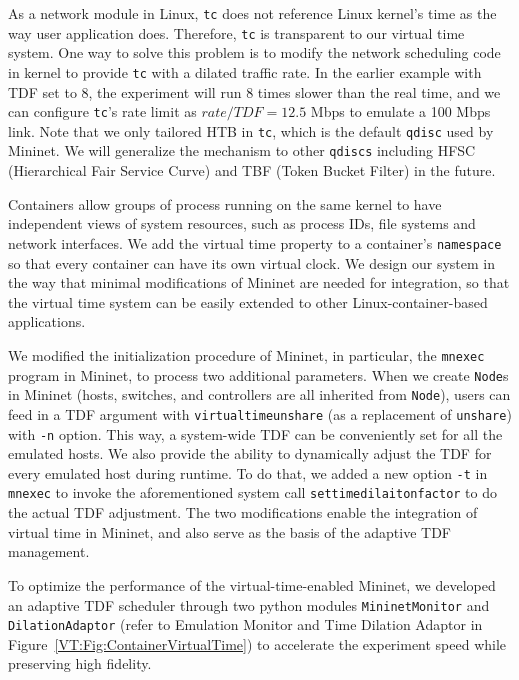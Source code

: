 As a network module in Linux, \texttt{tc} does not reference Linux kernel's time as the way user application does. 
Therefore, \texttt{tc} is transparent to our virtual time system. One way to solve this problem is to modify the network scheduling code in kernel to provide \texttt{tc} with a dilated traffic rate. 
In the earlier example with TDF set to 8, the experiment will run 8 times slower than the real time, and we can configure \texttt{tc}'s rate limit as $rate/TDF=12.5$ Mbps to emulate a 100 Mbps link. 
Note that we only tailored HTB in \texttt{tc}, which is the default \texttt{qdisc} used by Mininet. 
We will generalize the mechanism to other \texttt{qdiscs} including HFSC (Hierarchical Fair Service Curve) and TBF (Token Bucket Filter) in the future.


\label{VT:SubSec:ImplementMininet}
Containers allow groups of process running on the same kernel to have independent views of system resources, such as process IDs, file systems and network interfaces. 
We add the virtual time property to a container's \texttt{namespace}~\cite{LinuxNamespace} so that every container can have its own virtual clock. 
We design our system in the way that minimal modifications of Mininet are needed for integration, so that the virtual time system can be easily extended to other Linux-container-based applications. 

We modified the initialization procedure of Mininet, in particular, the \texttt{mnexec} program in Mininet, to process two additional parameters. 
When we create \texttt{Node}s in Mininet (hosts, switches, and controllers are all inherited from \texttt{Node}), users can feed in a TDF argument with \texttt{virtualtimeunshare} (as a replacement of \texttt{unshare}) with \texttt{-n} option. 
This way, a system-wide TDF can be conveniently set for all the emulated hosts. We also provide the ability to dynamically adjust the TDF for every emulated host during runtime. 
To do that, we added a new option \texttt{-t} in \texttt{mnexec} to invoke the aforementioned system call \texttt{settimedilaitonfactor} to do the actual TDF adjustment. 
The two modifications enable the integration of virtual time in Mininet, and also serve as the basis of the adaptive TDF management.

To optimize the performance of the virtual-time-enabled Mininet, we developed an adaptive TDF scheduler
through two python modules \texttt{MininetMonitor} and \texttt{DilationAdaptor}
(refer to Emulation Monitor and Time Dilation Adaptor in Figure~\ref{VT:Fig:ContainerVirtualTime})
to accelerate the experiment speed while preserving high fidelity.

